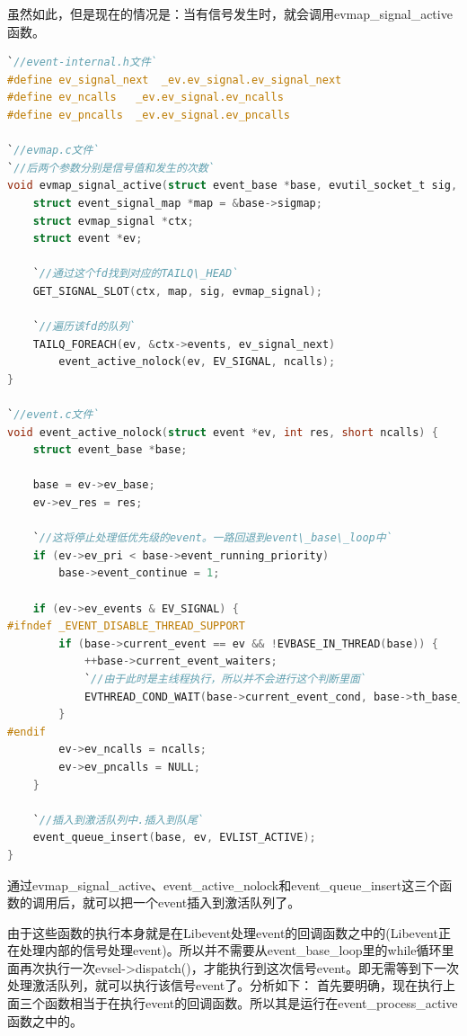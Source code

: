 \documentclass[11pt,a4paper]{article}
\begin{document}
虽然如此，但是现在的情况是：当有信号发生时，就会调用evmap\_signal\_active函数。
\begin{lstlisting}[language=C]
`//event-internal.h文件`
#define ev_signal_next  _ev.ev_signal.ev_signal_next    
#define ev_ncalls   _ev.ev_signal.ev_ncalls  
#define ev_pncalls  _ev.ev_signal.ev_pncalls  

`//evmap.c文件`
`//后两个参数分别是信号值和发生的次数`
void evmap_signal_active(struct event_base *base, evutil_socket_t sig, int ncalls) {  
    struct event_signal_map *map = &base->sigmap;  
    struct evmap_signal *ctx;  
    struct event *ev;  
  
    `//通过这个fd找到对应的TAILQ\_HEAD`
    GET_SIGNAL_SLOT(ctx, map, sig, evmap_signal);  
  
    `//遍历该fd的队列`
    TAILQ_FOREACH(ev, &ctx->events, ev_signal_next)  
        event_active_nolock(ev, EV_SIGNAL, ncalls);  
}  

`//event.c文件`
void event_active_nolock(struct event *ev, int res, short ncalls) {
    struct event_base *base;  
   
    base = ev->ev_base;  
    ev->ev_res = res;  
  
    `//这将停止处理低优先级的event。一路回退到event\_base\_loop中`
    if (ev->ev_pri < base->event_running_priority)  
        base->event_continue = 1;  
  
    if (ev->ev_events & EV_SIGNAL) {  
#ifndef _EVENT_DISABLE_THREAD_SUPPORT  
        if (base->current_event == ev && !EVBASE_IN_THREAD(base)) {  
            ++base->current_event_waiters;  
            `//由于此时是主线程执行，所以并不会进行这个判断里面`
            EVTHREAD_COND_WAIT(base->current_event_cond, base->th_base_lock);  
        }  
#endif  
        ev->ev_ncalls = ncalls;  
        ev->ev_pncalls = NULL;  
    }  
  
    `//插入到激活队列中.插入到队尾`
    event_queue_insert(base, ev, EVLIST_ACTIVE);
}  
\end{lstlisting}
通过evmap\_signal\_active、event\_active\_nolock和event\_queue\_insert这三个函数的调用后，就可以把一个event插入到激活队列了。

由于这些函数的执行本身就是在Libevent处理event的回调函数之中的(Libevent正在处理内部的信号处理event)。所以并不需要从event\_base\_loop里的while循环里面再次执行一次evsel->dispatch()，才能执行到这次信号event。即无需等到下一次处理激活队列，就可以执行该信号event了。分析如下：
首先要明确，现在执行上面三个函数相当于在执行event的回调函数。所以其是运行在event\_process\_active函数之中的。
\end{document}
